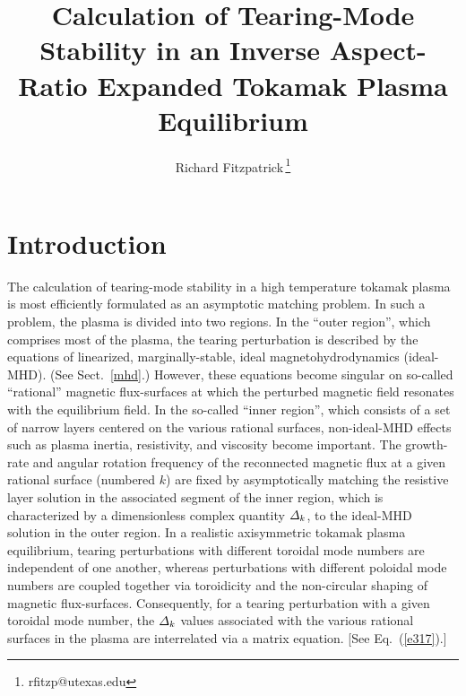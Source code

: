 \documentclass[12pt,prb,aps]{revtex4-1}
\begin{document}
\title{Calculation of Tearing-Mode Stability in an Inverse Aspect-Ratio Expanded Tokamak Plasma Equilibrium}
\author{Richard Fitzpatrick\,\footnote{rfitzp@utexas.edu}}

\maketitle

\section{Introduction} 
The calculation of tearing-mode stability in a high temperature tokamak plasma is most efficiently formulated as  an asymptotic
matching problem.\cite{fkr} In such a problem, the  plasma is  divided into two regions. In the ``outer region'', which comprises most
of the plasma, the tearing perturbation is described by the equations of linearized, marginally-stable, ideal magnetohydrodynamics (ideal-MHD). (See Sect.~\ref{mhd}.)
However, these equations become singular on so-called ``rational'' magnetic flux-surfaces at which the perturbed magnetic field resonates with the equilibrium field. In the so-called ``inner region'', which
consists of a set of narrow layers centered on the various rational surfaces, non-ideal-MHD effects such as plasma inertia, resistivity, and
viscosity become important. The growth-rate and angular rotation frequency of the reconnected magnetic flux at a given rational
surface (numbered $k$) are fixed by asymptotically matching the resistive layer
solution in the associated segment of the inner region, which is characterized by a dimensionless complex quantity ${\mit\Delta}_k$,  to the ideal-MHD solution in the outer region. In a realistic axisymmetric tokamak  plasma equilibrium, tearing
perturbations with different toroidal mode numbers are independent of one another, whereas perturbations with different poloidal
mode numbers are coupled together via toroidicity and the non-circular shaping of magnetic flux-surfaces.\cite{con0}
Consequently, for a tearing perturbation with a given toroidal mode number, 
 the ${\mit\Delta}_k$ values associated with  the various rational surfaces in the plasma are interrelated via a matrix equation.\cite{connor,cht,tokuda,brennan, ham,am1,am3} [See Eq.~(\ref{e317}).]
\end{document}
